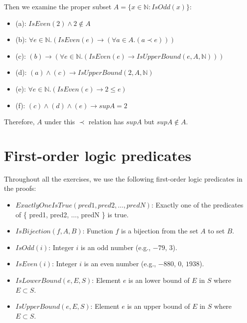 \documentclass[12pt, letterpaper, oneside]{book}
\begin{document}
Then we examine the proper subset $A = \{ x \in \mathbb{N}: IsOdd(x) \}$:
\begin{itemize}
  \item (a): $IsEven(2) \land 2 \notin A$
  \item (b): $\forall e \in \mathbb{N}. (IsEven(e) \rightarrow (\forall a \in A. (a \prec e)))$
  \item (c): $(b) \rightarrow (\forall e \in \mathbb{N}. (IsEven(e) \rightarrow IsUpperBound(e, A, \mathbb{N})))$
  \item (d): $(a) \land (c) \rightarrow IsUpperBound(2, A, \mathbb{N})$
  \item (e): $\forall e \in \mathbb{N}. (IsEven(e) \rightarrow 2 \le e)$
  \item (f): $(c) \land (d) \land (e) \rightarrow sup A = 2$
\end{itemize}

Therefore, $A$ under this $\prec$ relation has $sup A$ but $sup A \notin A$.

%
%

\chapter{First-order logic predicates}

Throughout all the exercises, we use the following first-order logic predicates in the proofs:

\begin{itemize}
  \item $ExactlyOneIsTrue(pred1, pred2, \ldots, predN)$: Exactly one of the predicates of \{ pred1, pred2, $\ldots$,
        predN \} is true.
  \item $IsBijection(f, A, B)$: Function $f$ is a bijection from the set $A$ to set $B$.
  \item $IsOdd(i)$: Integer $i$ is an odd number (e.g., $-79$, $3$).
  \item $IsEven(i)$: Integer $i$ is an even number (e.g., $-880$, $0$, $1938$).
  \item $IsLowerBound(e, E, S)$: Element $e$ is an lower bound of $E$ in $S$ where $E \subset S$.
  \item $IsUpperBound(e, E, S)$: Element $e$ is an upper bound of $E$ in $S$ where $E \subset S$.
\end{itemize}
\end{document}
